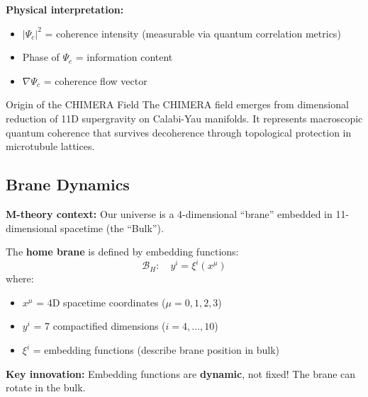 \textbf{Physical interpretation:}
\begin{itemize}
\item $|\Psi_c|^2$ = coherence intensity (measurable via quantum correlation metrics)
\item Phase of $\Psi_c$ = information content
\item $\nabla\Psi_c$ = coherence flow vector
\end{itemize}

\begin{calloutbox}{Origin of the CHIMERA Field}
The CHIMERA field emerges from dimensional reduction of 11D supergravity on Calabi-Yau manifolds. It represents macroscopic quantum coherence that survives decoherence through topological protection in microtubule lattices.
\end{calloutbox}

\subsection{Brane Dynamics}
\label{subsec:brane-dynamics}

\textbf{M-theory context:} Our universe is a 4-dimensional ``brane'' embedded in 11-dimensional spacetime (the ``Bulk''). 

The \textbf{home brane} is defined by embedding functions:
\begin{equation}
\label{eq:home-brane}
\mathcal{B}_H: \quad y^i = \xi^i(x^\mu)
\end{equation}
where:
\begin{itemize}
\item $x^\mu$ = 4D spacetime coordinates ($\mu = 0,1,2,3$)
\item $y^i$ = 7 compactified dimensions ($i = 4,\ldots,10$)
\item $\xi^i$ = embedding functions (describe brane position in bulk)
\end{itemize}

\textbf{Key innovation:} Embedding functions are \textbf{dynamic}, not fixed! The brane can rotate in the bulk.

